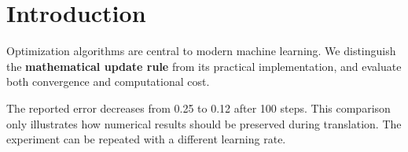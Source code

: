 \section{Introduction}
Optimization algorithms are central to modern machine learning. We distinguish the \textbf{mathematical update rule} from its practical implementation, and evaluate both convergence and computational cost.

The reported error decreases from 0.25 to 0.12 after 100 steps. This comparison only illustrates how numerical results should be preserved during translation. The experiment can be repeated with a different learning rate.
